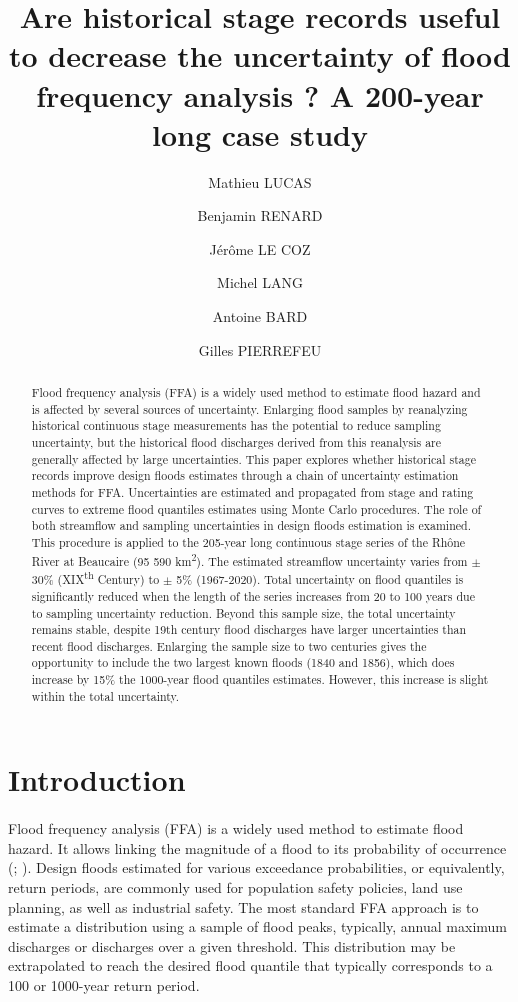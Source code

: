 \documentclass[11pt]{article}
\title{Are historical stage records useful to decrease the uncertainty of flood frequency analysis ? A 200-year long case study}
\author[1]{Mathieu LUCAS}
\author[2]{Benjamin RENARD}
\author[1]{Jérôme LE COZ}
\author[1]{Michel LANG}
\author[3]{Antoine BARD}
\author[4]{Gilles PIERREFEU}
\affil[1]{INRAE RIVERLY, Villeurbanne, France}
\affil[2]{INRAE RECOVER, Aix-En-Provence, France}
\affil[3]{ESDB, Briançon}
\affil[4]{CNR, Lyon}
\begin{document}
\maketitle

\begin{abstract}
    
    Flood frequency analysis (FFA) is a widely used method to estimate flood hazard and is affected by several sources of uncertainty. Enlarging flood samples by reanalyzing historical continuous stage measurements has the potential to reduce sampling uncertainty, but the historical flood discharges derived from this reanalysis are generally affected by large uncertainties. This paper explores whether historical stage records improve design floods estimates through a chain of uncertainty estimation methods for FFA. Uncertainties are estimated and propagated from stage and rating curves to extreme flood quantiles estimates using Monte Carlo procedures. The role of both streamflow and sampling uncertainties in design floods estimation is examined. This procedure  is applied to the 205-year long continuous stage series of the Rhône River at Beaucaire (95 590 km\textsuperscript{2}). The estimated streamflow uncertainty varies from $\pm$ 30\% (XIX\textsuperscript{th} Century) to $\pm$ 5\% (1967-2020). Total uncertainty on flood quantiles is significantly reduced when the length of the series increases from 20 to 100 years due to sampling uncertainty reduction. Beyond this sample size, the total uncertainty remains stable, despite 19th century flood discharges have larger uncertainties than recent flood discharges. Enlarging the sample size to two centuries gives the opportunity to include the two largest known floods (1840 and 1856), which does increase by 15\% the 1000-year flood quantiles estimates. However, this increase is slight within the total uncertainty. 
        
\end{abstract}

\section{Introduction}
    \paragraph{}
    Flood frequency analysis (FFA) is a widely used method to estimate flood hazard. It allows linking the magnitude of a flood to its probability of occurrence (\citet{hamed_flood_2019}; \citet{jain_design_2019}). Design floods estimated for various exceedance probabilities, or equivalently, return periods, are commonly used for population safety policies, land use planning, as well as industrial safety. The most standard FFA approach is to estimate a distribution using a sample of flood peaks, typically, annual maximum discharges or discharges over a given threshold. This distribution may be extrapolated to reach the desired flood quantile that typically corresponds to a 100 or 1000-year return period. 
    
\end{document}
